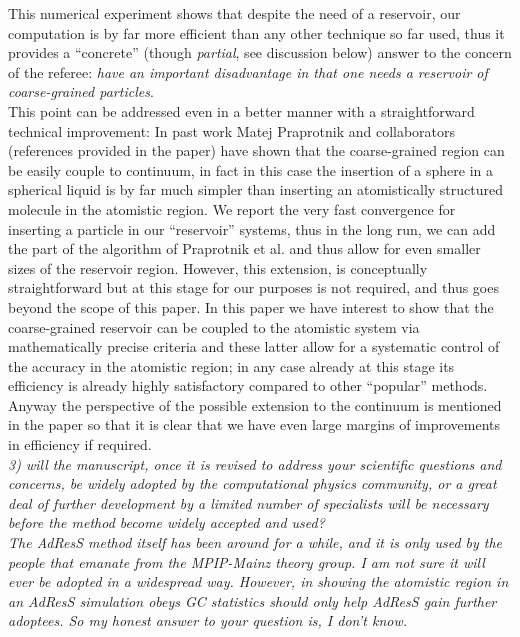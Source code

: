 \documentclass[12pt]{article}
\begin{document}
This numerical experiment shows that despite the need of a reservoir, our computation is by far more efficient than any other technique so far used, thus it provides a ``concrete'' (though {\it partial}, see discussion below) answer to the concern of the referee: {\it  have an important disadvantage in that one needs a reservoir of coarse-grained particles}.\\
This point can be addressed even in a better manner with a straightforward technical improvement:
In past work Matej Praprotnik and collaborators (references provided in the paper) have shown that the coarse-grained region can be easily couple to continuum, in fact in this case the insertion of a sphere in a spherical liquid is by far much simpler than inserting an atomistically structured molecule in the atomistic region. We report the very fast convergence for inserting a particle in our ``reservoir'' systems, thus in the long run, we can add the part of the algorithm of Praprotnik et al. and thus allow for even smaller sizes of the reservoir region. However, this extension, is conceptually straightforward but at this stage for our purposes is not required, and thus goes beyond the scope of this paper. In this paper we have interest to show that the coarse-grained reservoir can be coupled to the atomistic system via mathematically precise criteria and these latter allow for a systematic control of the accuracy in the atomistic region; in any case already at this stage its efficiency is already highly satisfactory compared to other ``popular'' methods. Anyway the perspective of the possible extension to the continuum is mentioned in the paper so that it is clear that we have even large margins of improvements in efficiency if required.\\

{\color{red} {\it 3) will the manuscript, once it is revised to address your scientific
questions and concerns, be widely adopted by the computational physics 
community, or a great deal of further development by a limited number
of specialists will be necessary before the method become widely
accepted and used?\\


The AdResS method itself has been around for a while, and it is only
used by the people that emanate from the MPIP-Mainz theory group. I am
not sure it will ever be adopted in a widespread way. However, in
showing the atomistic region in an AdResS simulation obeys GC
statistics should only help AdResS gain further adoptees. So my honest
answer to your question is, I don't know.}}\\
\end{document}
